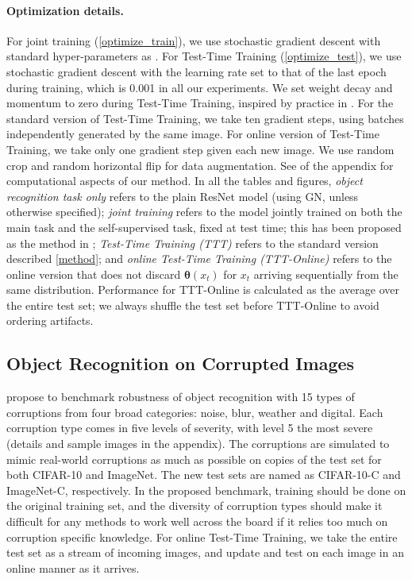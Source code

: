 \documentclass{article}
\theoremstyle{plain}
\theoremstyle{remark}
\theoremstyle{definition}
\def\vtheta{{\bm{\theta}}}
\begin{document}
\paragraph{Optimization details.}
For joint training (\autoref{optimize_train}),
we use stochastic gradient descent with standard hyper-parameters as \citep{huang2016deep, he2016deep}.
For Test-Time Training (\autoref{optimize_test}), we use stochastic gradient descent with the learning rate set to that of the last epoch during training, which is 0.001 in all our experiments. We set weight decay and momentum to zero during Test-Time Training, inspired by practice in \citep{he2018rethinking, liu2018rethinking}. For the standard version of Test-Time Training, we take ten gradient steps, using batches independently generated by the same image.
For online version of Test-Time Training, we take only one gradient step given each new image. We use random crop and random horizontal flip for data augmentation. See  of the appendix for computational aspects of our method.
In all the tables and figures, \emph{object recognition task only} refers to the plain ResNet model (using GN, unless otherwise specified);
\emph{joint training}
refers to the model jointly trained on both the main task and the self-supervised task, fixed at test time; this has been proposed as the method in \citet{hendrycks2019using};
\emph{Test-Time Training (TTT)}  refers to the standard version described \autoref{method};
and \emph{online Test-Time Training (TTT-Online)}  refers to the online version that does not discard $\vtheta(x_t)$ for $x_t$ arriving sequentially from the same distribution.
Performance for TTT-Online is calculated as the average over the entire test set; we always shuffle the test set before TTT-Online to avoid ordering artifacts.

\subsection{Object Recognition on Corrupted Images}
\label{results_cc}
\citet{hendrycks2019benchmarking} propose to benchmark robustness of object recognition with 15 types of corruptions
from four broad categories: noise, blur, weather and digital.  Each corruption type comes in five levels of severity, with level 5 the most severe (details and sample images in the appendix).
The corruptions are simulated to mimic real-world corruptions as much as possible on copies of the test set for both CIFAR-10 and ImageNet. The new test sets are named as CIFAR-10-C and ImageNet-C, respectively. 
In the proposed benchmark, training should be done on the original training set, and the diversity of corruption types should make it difficult for any methods to work well across the board if it relies too much on corruption specific knowledge. For online Test-Time Training, we take the entire test set as a stream of incoming images, and update and test on each image in an online manner as it arrives.
\end{document}
